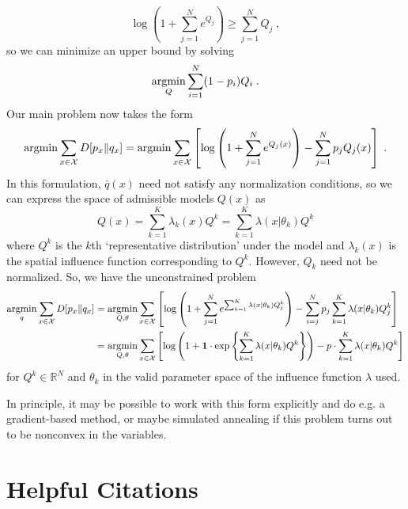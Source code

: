 \documentclass[english]{scrartcl}
\newcommand\R[0]{\mathbb{R}}
\newcommand{\argmin}{\operatornamewithlimits{argmin}}
\begin{document}
		\begin{equation}
			\log\left(1 + \sum_{j = 1}^N e^{Q_j}\right) \geq \sum_{j=1}^N Q_j\;,
		\end{equation}
		so we can minimize an upper bound by solving 
		\begin{equation}
			\argmin_{Q} \sum_{i=1}^N(1-p_i)Q_i\;.
		\end{equation}
		Our main problem now takes the form 
		\begin{equation}
			\argmin \sum_{x\in \mathcal{X}} D[p_x\|q_x] = \argmin \sum_{x\in\mathcal{X}} \left[\log \left(1 + \sum_{j = 1}^N e^{Q_j(x)}\right)  - \sum_{j=1}^N p_j Q_j(x)\right]\;.
		\end{equation}
		In this formulation, $\bar{q}(x)$ need not satisfy any normalization conditions, so we can express the space of admissible models $Q(x)$ as 
		\begin{equation}
			Q(x) = \sum_{k = 1}^K \lambda_k(x)Q^k = \sum_{k = 1}^K \lambda(x|\theta_k)Q^k
		\end{equation}
		where $Q^k$ is the $k$th `representative distribution' under the model and $\lambda_k(x)$ is the spatial influence function corresponding to $Q^k$. However, $Q_k$ need not be normalized. So, we have the unconstrained problem
		\begin{align}
			\argmin_{q} \sum_{x\in \mathcal{X}} D[p_x\|q_x] &= \argmin_{Q,\theta} \sum_{x\in\mathcal{X}} \left[\log \left(1 + \sum_{j = 1}^N e^{\sum_{k = 1}^K \lambda(x|\theta_k)Q_j^k}\right)  - \sum_{i=j}^N p_j \sum_{k = 1}^K \lambda(x|\theta_k)Q_j^k\right] \\
			&= \argmin_{Q,\theta} \sum_{x\in\mathcal{X}} \left[\log \left(1 + \mathbf{1} \cdot \exp \left\{ \sum_{k=1}^K \lambda(x|\theta_k)Q^k \right\}\right) - p\cdot \sum_{k=1}^K \lambda(x|\theta_k)Q^k \right]
		\end{align}
		for $Q^k \in \R^{N}$ and $\theta_k$ in the valid parameter space of the influence function $\lambda$ used. 
		
		In principle, it may be possible to work with this form explicitly and do e.g. a gradient-based method, or maybe simulated annealing if this problem turns out to be nonconvex in the variables. 
		



\section{Helpful Citations}
\end{document}
